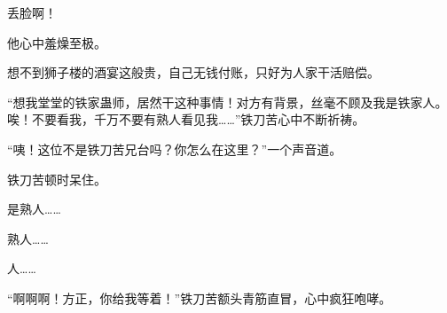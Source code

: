 \begin{this_body}
丢脸啊！

他心中羞燥至极。

想不到狮子楼的酒宴这般贵，自己无钱付账，只好为人家干活赔偿。

“想我堂堂的铁家蛊师，居然干这种事情！对方有背景，丝毫不顾及我是铁家人。唉！不要看我，千万不要有熟人看见我……”铁刀苦心中不断祈祷。

“咦！这位不是铁刀苦兄台吗？你怎么在这里？”一个声音道。

铁刀苦顿时呆住。

是熟人……

熟人……

人……

“啊啊啊！方正，你给我等着！”铁刀苦额头青筋直冒，心中疯狂咆哮。

\end{this_body}

